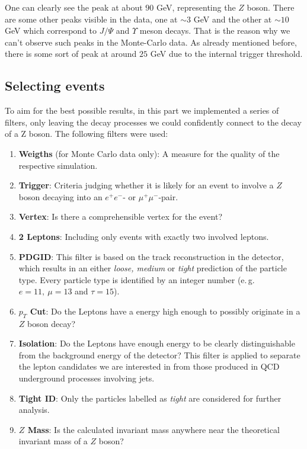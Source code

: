 \documentclass[twocolumn,
			   showpacs,%
               nofootinbib,
               aps,%
               prd,
               notitlepage,
               showkeys,
               10pt]{revtex4-1}
\begin{document}
One can clearly see the peak at about $90$ GeV, representing the $Z$ boson. There are some other peaks visible in the data, one at $\sim 3$ GeV and the other at $\sim 10$ GeV which correspond to $J/\Psi$ and $\Upsilon$ meson decays. That is the reason why we can't observe such peaks in the Monte-Carlo data. As already mentioned before, there is some sort of peak at around $25$ GeV due to the internal trigger threshold.

\subsection{Selecting events}
To aim for the best possible results, in this part we implemented a series of filters, only leaving the decay processes we could confidently connect to the decay of a Z boson.
The following filters were used:
\begin{enumerate}
\item \textbf{Weigths} (for Monte Carlo data only): A measure for the quality of the respective simulation.
\item \textbf{Trigger}: Criteria judging whether it is likely for an event to involve a $Z$ boson decaying into an $e^{+}e^{-}$- or $\mu^{+}\mu^{-}$-pair.
\item \textbf{Vertex}: Is there a comprehensible vertex for the event?
\item \textbf{2 Leptons}: Including only events with exactly two involved leptons.
\item \textbf{PDGID}: This filter is based on the track reconstruction in the detector, which results in an either \textit{loose, medium} or \textit{tight} prediction of the particle type. Every particle type is identified by an integer number (e.\,g. $e = 11 , \ \mu = 13$ and $\tau = 15$).
\item \textbf{$p_T$ Cut}: Do the Leptons have a energy high enough to possibly originate in a $Z$ boson decay?
\item \textbf{Isolation}: Do the Leptons have enough energy to be clearly distinguishable from the background energy of the detector? This filter is applied to separate the lepton candidates we are interested in from those produced in QCD underground processes involving jets.  
\item \textbf{Tight ID}: Only the particles labelled as \textit{tight} are considered for further analysis.
\item \textbf{$Z$ Mass}: Is the calculated invariant mass anywhere near the theoretical invariant mass of a $Z$ boson?
\end{enumerate}
\end{document}
